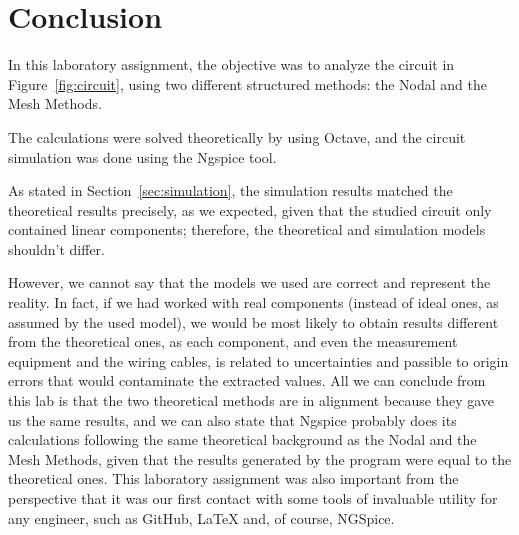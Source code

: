 \section{Conclusion}
\label{sec:conclusion}

In this laboratory assignment, the objective was to analyze the circuit in Figure~\ref{fig:circuit}, using two different structured methods: the Nodal and the Mesh Methods. 

The calculations were solved theoretically by using Octave, and the circuit simulation was done using the Ngspice tool.

As stated in Section~\ref{sec:simulation}, the simulation results matched the theoretical results
precisely, as we expected, given that the studied circuit only contained linear components; therefore, the theoretical
and simulation models shouldn't differ. 

However, we cannot say that the models we used are correct and represent the reality. In fact, if we had worked with real components (instead of ideal ones, as assumed by the used model), we would be most likely to obtain results different from the theoretical ones, as each component, and even the measurement equipment and the wiring cables, is related to uncertainties and passible to origin errors that would contaminate the extracted values. All we can conclude from this lab is that the two theoretical methods are in alignment because they gave us the same results, and we can also state that Ngspice probably does its calculations following the same theoretical background as the Nodal and the Mesh Methods, given that the results generated by the program were equal to the theoretical ones.
This laboratory assignment was also important from the perspective that it was our first contact with some tools of invaluable utility for any engineer, such as GitHub, LaTeX and, of course, NGSpice.
